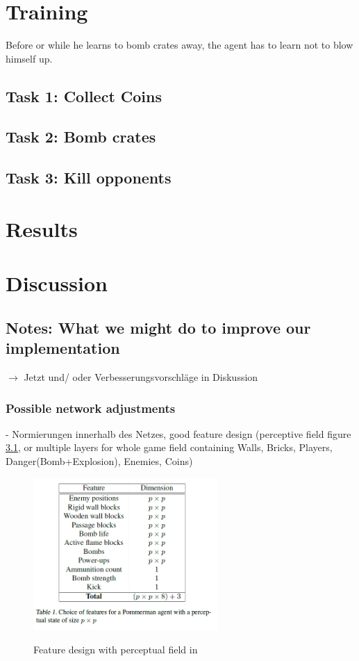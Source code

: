 \documentclass[a4paper ,12pt]{report}
\begin{document}
	\chapter{Training}
	Before or while he learns to bomb crates away, the agent has to learn not to blow himself up.
	
	\section{Task 1: Collect Coins}
	
	\section{Task 2: Bomb crates}
	
	\section{Task 3: Kill opponents}
	
	
	\chapter{Results}
	
	\newpage
	
	\chapter{Discussion}
	
	\section*{Notes: What we might do to improve our implementation}
	$\rightarrow$ Jetzt und/ oder Verbesserungsvorschläge in Diskussion
	
	\subsection*{Possible network adjustments}
	
	- Normierungen innerhalb des Netzes, good feature design (perceptive field figure \ref{fig:feat1}, or multiple layers for whole game field containing Walls, Bricks, Players, Danger(Bomb+Explosion), Enemies, Coins)
	
	\begin{figure}[ht]
		\caption{Feature design with perceptual field in \cite{Pommerman}}
		\includegraphics[width=7cm]{features_with_perceptual_field.png}
		\label{fig:feat1}
	\end{figure}
	
\end{document}
